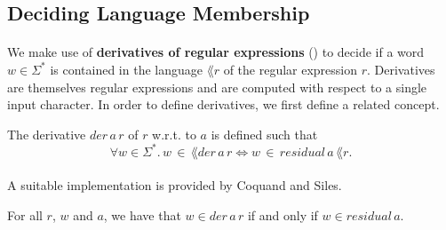 

    \subsection{Deciding Language Membership}
    \paragraph{}
    We make use of \textbf{derivatives of regular expressions} (\cite{DBLP:journals/jacm/Brzozowski64}) to decide if a word $w \in \Sigma^*$ is contained in the language $\lang{r}$ of the regular expression $r$. 
    Derivatives are themselves regular expressions and are computed with respect to a single input character. 
    In order to define derivatives, we first define a related concept.


    \begin{definition}{}
        \label{derivative}
        The derivative $der \,  a \, r$ of $r$ w.r.t. to $a$ is defined such that 
        \begin{equation*}       \forall w \in \Sigma^*. \, w \, \in \, \lang{der \, a \, r} \Leftrightarrow w \, \in \, residual \, a \, \lang{r}. \end{equation*}
        \end{definition}

        \paragraph{}
        A suitable implementation is provided by Coquand and Siles.



        \begin{theorem}
            \label{der_correct}
            For all $r$, $w$ and $a$, we have that $w \in der \, a \, r$ if and only if $w \in residual \, a $.
        \end{theorem}

